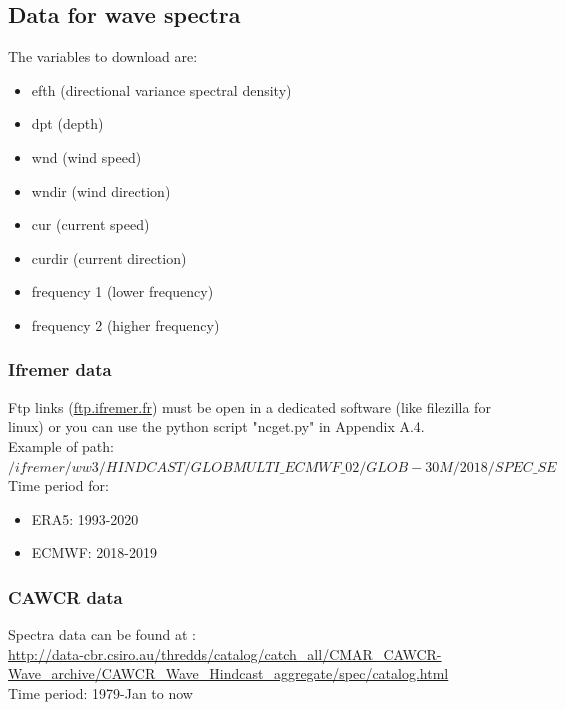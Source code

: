 \documentclass[preprints,briefreport,accept,oneauthor,pdftex]{Definitions/mdpi}
\begin{document}
\subsection{Data for wave spectra}
The variables to download are:
\begin{itemize}
    \item efth (directional variance spectral density) 
    \item dpt (depth)
    \item wnd (wind speed)
     \item wndir (wind direction)
     \item cur (current speed)
     \item curdir (current direction)
     \item frequency 1 (lower frequency)
     \item frequency 2 (higher frequency)
\end{itemize}
\subsubsection{Ifremer data}
\noindent Ftp links (\url{ftp.ifremer.fr}) must be open in a dedicated software (like filezilla for linux) or you can use the python script "ncget.py" in Appendix A.4.\\
Example of path: \\
$/ifremer/ww3/HINDCAST/GLOBMULTI\_ECMWF\_02/GLOB-30M/2018/SPEC\_SE$\\
Time period for:
\begin{itemize}
      \item ERA5: 1993-2020
    \item ECMWF: 2018-2019
\end{itemize}

\subsubsection{CAWCR data}
\noindent Spectra data can be found at :\\ \url{http://data-cbr.csiro.au/thredds/catalog/catch_all/CMAR_CAWCR-Wave_archive/CAWCR_Wave_Hindcast_aggregate/spec/catalog.html}\\
Time period: 1979-Jan to now

\end{document}

